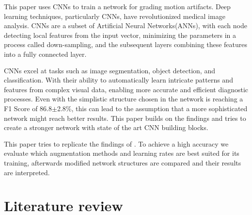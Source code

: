 \documentclass[
a4paper, 
12pt,
grayscalebody, %
abstract=on,
twoside, BCOR10mm, 12pt, DIV13,headinclude, footexclude, final, abstracton, openright
]{ibireprt}
\numberwithin{equation}{chapter}
\numberwithin{table}{chapter}
\numberwithin{figure}{chapter}
\numberwithin{algorithm}{chapter}
\numberwithin{example}{chapter}
\numberwithin{example}{chapter}
\begin{document}
This paper uses CNNs to train a network for grading motion artifacts. Deep learning techniques, particularly CNNs, have revolutionized medical image analysis. CNNs are a subset of Artificial Neural Networks(ANNs), with each node detecting local features from the input vector, minimizing the parameters in a process called down-sampling, and the subsequent layers combining these features into a fully connected layer.%

CNNs excel at tasks such as image segmentation, object detection, and classification. With their ability to automatically learn intricate patterns and features from complex visual data, enabling more accurate and efficient diagnostic processes. %
Even with the simplistic structure chosen in \cite{Walle2023} the network is reaching a F1 Score of 86.8$\pm$2.8\%, this can lead to the assumption that a more sophisticated network might reach better results. This paper builds on the findings and tries to create a stronger network with state of the art CNN building blocks.  

This paper tries to replicate the findings of \cite{Walle2023}. To achieve a high accuracy we evaluate which augmentation methods and learning rates are best suited for its training, afterwards modified network structures are  compared and their results are interpreted. 



\chapter{Literature review}
\end{document}
